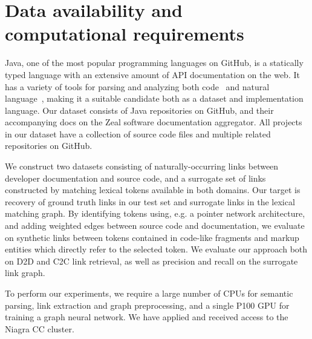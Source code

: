 \documentclass{article}
\begin{document}
\section{Data availability and computational requirements}

Java, one of the most popular programming languages on GitHub, is a statically typed language with an extensive amount of API documentation on the web. It has a variety of tools for parsing and analyzing both code~\citep{kovalenko2019pathminer} and natural language~\citep{manning2014stanford, grella2018non}, making it a suitable candidate both as a dataset and implementation language. Our dataset consists of Java repositories on GitHub, and their accompanying docs on the Zeal software documentation aggregator. All projects in our dataset have a collection of source code files and multiple related repositories on GitHub.

We construct two datasets consisting of naturally-occurring links between developer documentation and source code, and a surrogate set of links constructed by matching lexical tokens available in both domains. Our target is recovery of ground truth links in our test set and surrogate links in the lexical matching graph. By identifying tokens using, e.g. a pointer network architecture, and adding weighted edges between source code and documentation, we evaluate on synthetic links between tokens contained in code-like fragments and markup entities which directly refer to the selected token. We evaluate our approach both on D2D and C2C link retrieval, as well as precision and recall on the surrogate link graph.

To perform our experiments, we require a large number of CPUs for semantic parsing, link extraction and graph preprocessing, and a single P100 GPU for training a graph neural network. We have applied and received access to the Niagra CC cluster.



\end{document}
